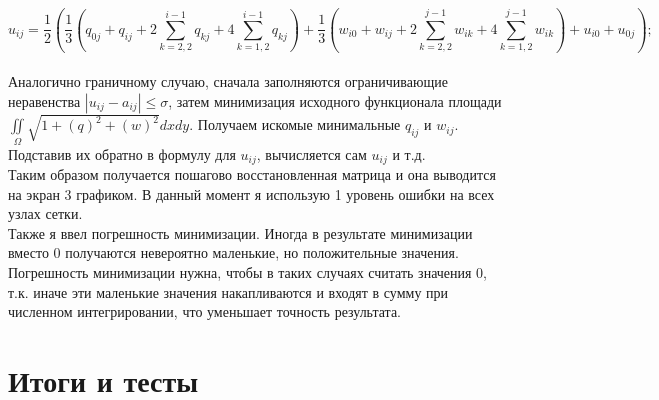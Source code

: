 \documentclass{report}
\newcommand{\ttt}{\hspace*{4mm}}
\begin{document}
	$$ u_{ij} = \frac{1}{2}(\frac{1}{3} (q_{0j} + q_{ij} + 2\sum_{k=2,2}^{i-1}q_{kj} + 4\sum_{k=1,2}^{i-1}q_{kj} ) + \frac{1}{3} (w_{i0} + w_{ij} + 2\sum_{k=2,2}^{j-1}w_{ik} + 4\sum_{k=1,2}^{j-1}w_{ik} )+ u_{i0}+ u_{0j});$$
\\
\ttt Аналогично граничному случаю, сначала заполняются ограничивающие неравенства $|u_{ij} - a_{ij}| \leq \sigma$, затем минимизация исходного функционала площади $\iint\limits_\Omega \sqrt{1+(q)^2 + (w)^2}dxdy$. Получаем искомые минимальные $q_{ij}$ и $w_{ij}$. Подставив их обратно в формулу для $u_{ij}$, вычисляется сам $u_{ij}$ и т.д.\\
\ttt Таким образом получается пошагово восстановленная матрица и она выводится на экран 3 графиком. В данный момент я использую 1 уровень ошибки на всех узлах сетки.\\
\ttt Также я ввел погрешность минимизации. Иногда в результате минимизации вместо 0 получаются невероятно маленькие, но положительные значения. Погрешность минимизации нужна, чтобы в таких случаях считать значения 0, т.к. иначе эти маленькие значения накапливаются и входят в сумму при численном интегрировании, что уменьшает точность результата. 
\section*{Итоги и тесты}
\end{document}

